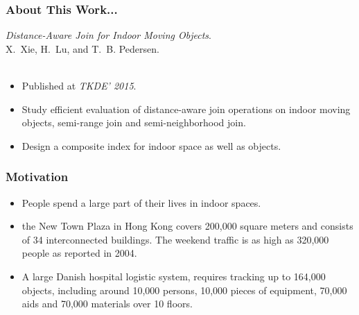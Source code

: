 \begin{frame}
\frametitle{About This Work...}

\emph{Distance-Aware Join for Indoor Moving Objects}.~\cite{xie2015distance} \\
X.~Xie, H.~Lu, and T.~B. Pedersen.\\~\\

\begin{itemize}
  \item Published at \emph{TKDE' 2015}.
  \item Study efficient evaluation of distance-aware join operations on indoor moving objects, semi-range join and semi-neighborhood join.
  \item Design a composite index for indoor space as well as objects.
\end{itemize}

\end{frame}


\begin{frame}
\frametitle{Motivation}

\begin{itemize}
  \item People spend a large part of their lives in indoor spaces.

  \item the New Town Plaza in Hong Kong covers 200,000 square meters and consists of 34 interconnected buildings. The weekend traffic is as high as 320,000 people as reported in 2004.

  \item A large Danish hospital logistic system, requires tracking up to 164,000 objects, including around 10,000 persons, 10,000 pieces of equipment, 70,000 aids and 70,000 materials over 10 floors.

\end{itemize}

\end{frame}


